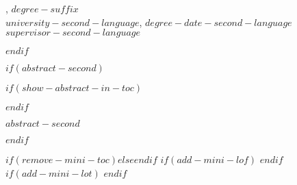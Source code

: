 \documentclass[letterpaper, $if(page-layout)$$page-layout$$else$nobind$endif$]{templates/ociamthesis}
\begin{document}
\begin{romanpages}
\begin{center}
  \vspace{18pt}
  
  \begin{spacing}{2}
  \end{spacing}

  \vspace{18pt}

  \begin{spacing}{1.4}
    , 
    $degree-suffix$\\
    $university-second-language$, 
    $degree-date-second-language$\\
    \vspace{18pt}
    $supervisor-second-language$
  \end{spacing}

\end{center}

\begin{spacing}{1.5}
  \indent
\end{spacing}


$endif$

$if(abstract-second)$

$if(show-abstract-in-toc)$
\renewcommand{\numberstyleabstract}{plain}
$endif$

\renewcommand{\abstractsecondtitle}{$abstract-second-heading$}
\begin{abstractsecond}
	$abstract-second$
\end{abstractsecond}

$endif$

$if(remove-mini-toc)$$else$\dominitoc$endif$ %
$if(add-mini-lof)$
  \dominilof  %
$endif$
$if(add-mini-lot)$
  \dominilot  %
$endif$

\flushbottom


\end{romanpages}
\end{document}
